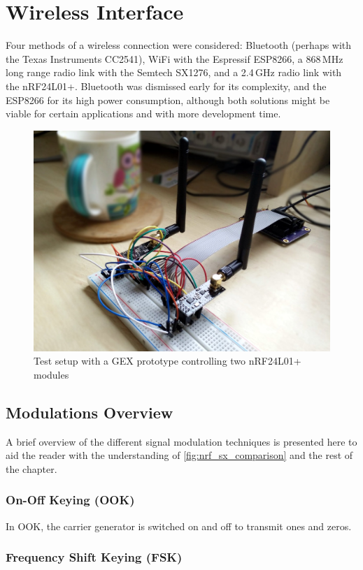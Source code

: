 \chapter{Wireless Interface} \label{sec:wireless}

Four methods of a wireless connection were considered: Bluetooth (perhaps with the Texas Instruments CC2541), WiFi with the Espressif ESP8266, a 868\,MHz long range radio link with the Semtech SX1276, and a 2.4\,GHz radio link with the nRF24L01+. Bluetooth was dismissed early for its complexity, and the ESP8266 for its high power consumption, although both solutions might be viable for certain applications and with more development time.

\begin{figure}[h]
	\centering
	\includegraphics[width=.7\textwidth]{img/nrf-testing.jpg}
	\caption{Test setup with a GEX prototype controlling two nRF24L01+ modules}
\end{figure}

\section{Modulations Overview}

A brief overview of the different signal modulation techniques is presented here to aid the reader with the understanding of \cref{fig:nrf_sx_comparison} and the rest of the chapter.

\subsection{On-Off Keying (OOK)}

In \gls{OOK}, the carrier generator is switched on and off to transmit ones and zeros.

\subsection{Frequency Shift Keying (FSK)}


